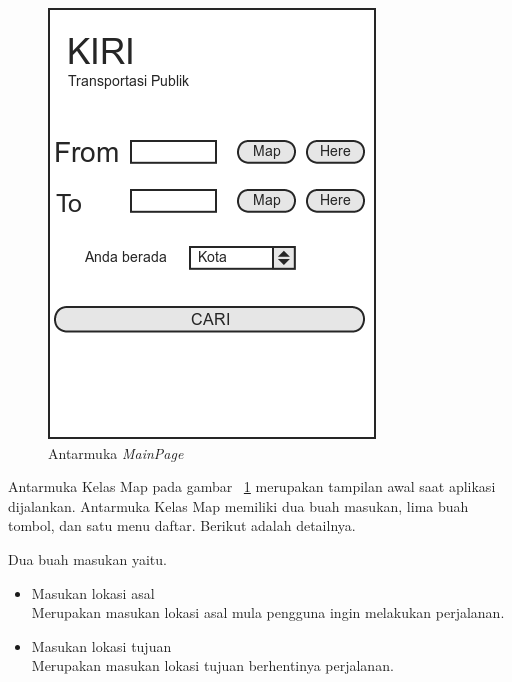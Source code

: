 \begin{figure}[h]
	\centering
		\includegraphics[scale=0.6]{Gambar/perancangan_antarmuka/Home}
	\caption{Antarmuka \textit{MainPage}}
	\label{fig:Antarmuka MainPage}
\end{figure}

\hspace{0.5cm} Antarmuka Kelas Map pada gambar ~\ref{fig:Antarmuka MainPage} merupakan tampilan awal saat aplikasi dijalankan. Antarmuka Kelas Map memiliki dua buah masukan, lima buah tombol, dan satu menu daftar. Berikut adalah detailnya.

Dua buah masukan yaitu.
\begin{itemize}
	\item Masukan lokasi asal\\
	Merupakan masukan lokasi asal mula pengguna ingin melakukan perjalanan.
	\item Masukan lokasi tujuan\\
	Merupakan masukan lokasi tujuan berhentinya perjalanan.
\end{itemize}

